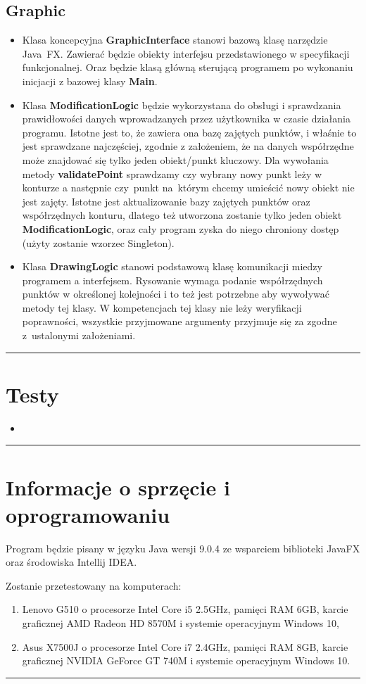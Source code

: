 \documentclass[a4paper,11pt]{article}
\newcommand{\linia}{\rule{\linewidth}{0.4mm}}
\begin{document}
\subsection{Graphic}
\begin{itemize}
\item Klasa koncepcyjna \textbf{GraphicInterface} stanowi bazową klasę narzędzie Java~FX. Zawierać będzie obiekty interfejsu przedstawionego w specyfikacji funkcjonalnej. Oraz będzie klasą główną sterującą programem po wykonaniu inicjacji z bazowej klasy \textbf{Main}.
\item Klasa \textbf{ModificationLogic} będzie wykorzystana do obsługi i sprawdzania prawidłowości danych wprowadzanych przez użytkownika w czasie działania programu. Istotne jest to, że zawiera ona bazę zajętych punktów, i właśnie to jest sprawdzane najczęściej, zgodnie z założeniem, że na danych współrzędne może znajdować się tylko jeden obiekt/punkt kluczowy. Dla wywołania metody \textbf{validatePoint} sprawdzamy czy wybrany nowy punkt leży w konturze a następnie czy~punkt na~którym chcemy umieścić nowy obiekt nie jest zajęty. Istotne jest aktualizowanie bazy zajętych punktów oraz współrzędnych konturu, dlatego też utworzona zostanie tylko jeden obiekt \textbf{ModificationLogic}, oraz cały program zyska do niego chroniony dostęp (użyty zostanie wzorzec Singleton).
\item Klasa \textbf{DrawingLogic} stanowi podstawową klasę komunikacji miedzy programem a interfejsem. Rysowanie wymaga podanie współrzędnych punktów w określonej kolejności i to też jest potrzebne aby wywoływać metody tej klasy. W kompetencjach tej klasy nie leży weryfikacji poprawności, wszystkie przyjmowane argumenty przyjmuje się za zgodne z~ustalonymi założeniami. 
\end{itemize}

\noindent\linia

\section{Testy}
\begin{itemize}
\item 
\end{itemize}

\noindent\linia
\section{Informacje o sprzęcie i oprogramowaniu}
Program będzie pisany w języku Java wersji 9.0.4 ze wsparciem biblioteki JavaFX oraz środowiska Intellij IDEA.

Zostanie przetestowany na komputerach:
\begin{enumerate}
\item Lenovo G510 o procesorze Intel Core i5 2.5GHz, pamięci RAM 6GB, karcie graficznej AMD Radeon
HD 8570M i systemie operacyjnym Windows 10,
\item Asus X7500J o procesorze Intel Core i7 2.4GHz, pamięci RAM 8GB, karcie graficznej NVIDIA GeForce GT 740M i systemie operacyjnym Windows 10. 
\end{enumerate} 
\noindent\linia
\end{document}
